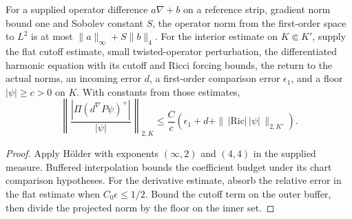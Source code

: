 \begin{lemma}
\label{lem:spin-strip-derivative}
\leanok
For a supplied operator difference $a\nabla+b$ on a reference strip,
gradient norm bound one and Sobolev constant $S$, the operator norm
from the first-order space to $L^2$ is at most
$\|a\|_\infty+S\|b\|_4$. For the interior estimate on $K\Subset K'$,
supply the flat cutoff estimate, small twisted-operator perturbation,
the differentiated harmonic equation with its cutoff and Ricci forcing
bounds, the return to the actual norms, an incoming error $d$, a
first-order comparison error $\epsilon_1$, and a floor $|\psi|\ge c>0$
on $K$. With constants from those estimates,
\[
 \left\|\frac{|\Pi(d^\nabla P\psi)^+|}{|\psi|}\right\|_{2,K}
 \le \frac{C}{c}\left(\epsilon_1+d+
       \|\,|\mathrm{Ric}|\,|\psi|\,\|_{2,K'}\right).
\]
\end{lemma}
\begin{proof}
\leanok
Apply H\"older with exponents $(\infty,2)$ and $(4,4)$ in the supplied
measure. Buffered interpolation bounds the coefficient budget under its
chart comparison hypotheses. For the derivative estimate, absorb the
relative error in the flat estimate when $C_0\epsilon\le1/2$. Bound the
cutoff term on the outer buffer, then divide the projected norm by the
floor on the inner set.
\end{proof}


